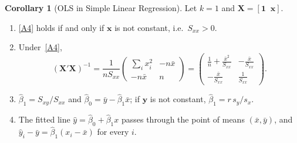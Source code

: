 \documentclass[12pt,a4paper]{article}
\theoremstyle{definition}
\newtheorem{corollary}[theorem]{Corollary}
\newcommand{\bX}{\mathbf{X}}
\newcommand{\by}{\mathbf{y}}
\newcommand{\bx}{\mathbf{x}}
\newcommand{\bone}{\mathbf{1}}
\begin{document}
\begin{corollary}[OLS in Simple Linear Regression]\label{cor:slr}
Let $k = 1$ and $\bX = [\bone \;\; \bx]$.
\begin{enumerate}[label=\textup{(\roman*)}]
\item \ref{A4} holds if and only if $\bx$ is not constant, i.e.\ $S_{xx} > 0$.
\item\label{slr:ii} Under~\ref{A4},
\[
(\bX'\bX)^{-1} = \frac{1}{nS_{xx}}\begin{pmatrix} \sum_i x_i^2 & -n\bar x\\ -n\bar x & n\end{pmatrix} = \begin{pmatrix} \frac{1}{n} + \frac{\bar x^2}{S_{xx}} & -\frac{\bar x}{S_{xx}}\\[2pt] -\frac{\bar x}{S_{xx}} & \frac{1}{S_{xx}}\end{pmatrix}.
\]
\item\label{slr:iii} $\hat\beta_1 = S_{xy}/S_{xx}$ and $\hat\beta_0 = \bar y - \hat\beta_1\bar x$; if $\by$ is not constant, $\hat\beta_1 = r\,s_y/s_x$.
\item\label{slr:iv} The fitted line $\hat y = \hat\beta_0 + \hat\beta_1 x$ passes through the point of means $(\bar x, \bar y)$, and $\hat y_i - \bar y = \hat\beta_1(x_i - \bar x)$ for every $i$.
\end{enumerate}
\end{corollary}
\end{document}
